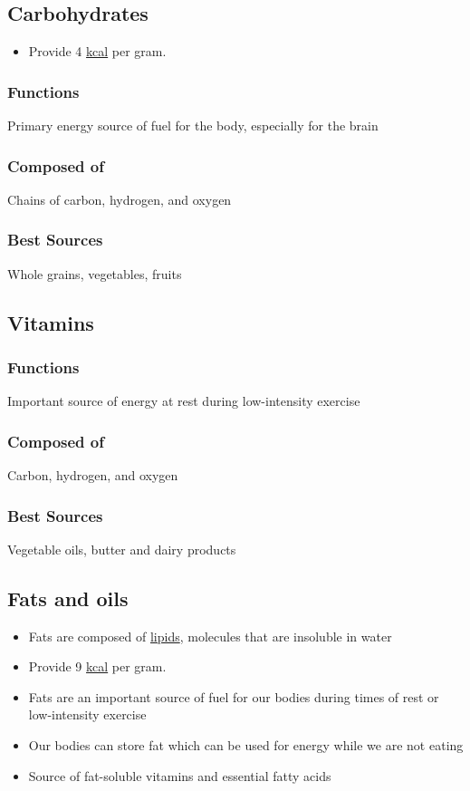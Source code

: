 \documentclass[title={Chapter 1}]{fdsn201notes}
\begin{document}
\textcolor{nutrientgreen}{\subsection{Carbohydrates}\label{subsec:carbohydrates}}
\begin{itemize}
	\item Provide 4 \hyperref[dfn:kcal]{kcal} per gram.
\end{itemize}
\subsubsection{Functions} Primary energy source of fuel for the body, especially for the brain

\subsubsection{Composed of} Chains of carbon, hydrogen, and oxygen

\subsubsection{Best Sources} Whole grains, vegetables, fruits

\textcolor{nutrientorange}{\subsection{Vitamins}\label{subsec:vitamins}}
\subsubsection{Functions} Important source of energy at rest during low-intensity exercise

\subsubsection{Composed of} Carbon, hydrogen, and oxygen

\subsubsection{Best Sources} Vegetable oils, butter and dairy products

\textcolor{nutrientpink}{\subsection{Fats and oils}\label{subsec:fats-and-oils}}
\begin{itemize}
	\item Fats are composed of \hyperref[dfn:lipids]{lipids}, molecules that are insoluble in water
	\item Provide 9 \hyperref[dfn:kcal]{kcal} per gram.
	\item Fats are an important source of fuel for our bodies during times of rest or low-intensity exercise
	\item Our bodies can store fat which can be used for energy while we are not eating
	\item Source of fat-soluble vitamins and essential fatty acids
\end{itemize}
\end{document}
